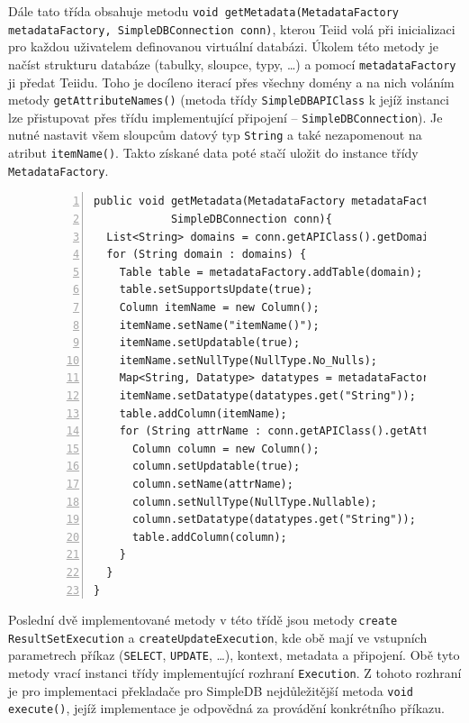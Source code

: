 \documentclass[oneside,12pt,final]{fithesis2}
\begin{document}
Dále tato třída obsahuje metodu \texttt{void getMetadata(MetadataFactory metadataFactory, SimpleDBConnection conn)}, kterou Teiid volá při inicializaci pro každou uživatelem definovanou virtuální databázi. Úkolem této metody je načíst strukturu databáze (tabulky, sloupce, typy, \dots) a pomocí \texttt{metadataFactory} ji předat Teiidu. Toho je docíleno iterací přes všechny domény a na nich voláním metody \texttt{getAttributeNames()} (metoda třídy \texttt{SimpleDBAPIClass} k jejíž instanci lze přistupovat přes třídu implementující připojení -- \texttt{SimpleDBConnection}). Je nutné nastavit všem sloupcům datový typ \texttt{String} a také nezapomenout na atribut \texttt{itemName()}. Takto získané data poté stačí uložit do instance třídy \texttt{MetadataFactory}.

\begin{figure}[h]
 \begin{Verbatim}[fontsize=\small,numbers=left]
public void getMetadata(MetadataFactory metadataFactory, 
			SimpleDBConnection conn){
  List<String> domains = conn.getAPIClass().getDomains();
  for (String domain : domains) {
    Table table = metadataFactory.addTable(domain);
    table.setSupportsUpdate(true);
    Column itemName = new Column();
    itemName.setName("itemName()");
    itemName.setUpdatable(true);
    itemName.setNullType(NullType.No_Nulls);
    Map<String, Datatype> datatypes = metadataFactory.getDataTypes();
    itemName.setDatatype(datatypes.get("String"));
    table.addColumn(itemName);
    for (String attrName : conn.getAPIClass().getAttributeNames(domain)) {
      Column column = new Column();
      column.setUpdatable(true);
      column.setName(attrName);
      column.setNullType(NullType.Nullable);
      column.setDatatype(datatypes.get("String"));
      table.addColumn(column);
    }
  }
}
 \end{Verbatim}

\end{figure}

Poslední dvě implementované metody v této třídě jsou metody \texttt{create ResultSetExecution} a \texttt{createUpdateExecution}, kde obě mají ve vstupních parametrech příkaz (\texttt{SELECT}, \texttt{UPDATE}, \dots), kontext, metadata a připojení. Obě tyto metody vrací instanci třídy implementující rozhraní \texttt{Execution}. Z tohoto rozhraní je pro implementaci překladače pro SimpleDB nejdůležitější metoda \texttt{void execute()}, jejíž implementace je odpovědná za provádění konkrétního příkazu.
\end{document}
